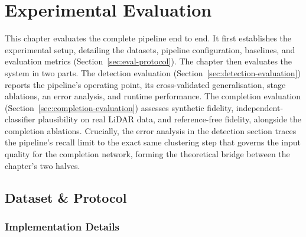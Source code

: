 %
%
\chapter{Experimental Evaluation}
\label{ch:evaluation}

This chapter evaluates the complete pipeline end to end. It first establishes the experimental
setup, detailing the datasets, pipeline configuration, baselines, and evaluation metrics
(Section~\ref{sec:eval-protocol}). The chapter then evaluates the system in two parts. The
detection evaluation (Section~\ref{sec:detection-evaluation}) reports the pipeline's operating
point, its cross-validated generalisation, stage ablations, an error analysis, and runtime
performance. The completion evaluation (Section~\ref{sec:completion-evaluation}) assesses synthetic
fidelity, independent-classifier plausibility on real LiDAR data, and reference-free fidelity,
alongside the completion ablations. Crucially, the error analysis in the detection section traces
the pipeline's recall limit to the exact same clustering step that governs the input quality for
the completion network, forming the theoretical bridge between the chapter's two halves.

\section{Dataset \& Protocol}
\label{sec:eval-sequences}

\subsection{Implementation Details}
\label{sec:eval-pipeline}

